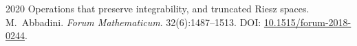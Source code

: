 \pubrow
  {2020}
  {Operations that preserve integrability, and truncated {R}iesz spaces.}
  {M.\ Abbadini.}
  {\emph{Forum Mathematicum}. 32(6):1487--1513. DOI: \href{https://doi.org/10.1515/forum-2018-0244}{10.1515/forum-2018-0244}.}

